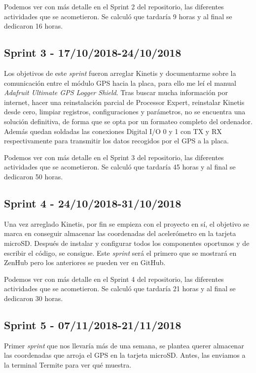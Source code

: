 Podemos ver con más detalle en el Sprint 2 del repositorio, las diferentes actividades que se acometieron. 
Se calculó que tardaría 9 horas y al final se dedicaron 16 horas.

\subsection{Sprint 3 - 17/10/2018-24/10/2018}
Los objetivos de este \textit{sprint} fueron arreglar Kinetis y documentarme sobre la comunicación entre el módulo GPS hacia la placa, para ello me leí el manual \textit{Adafruit Ultimate GPS Logger Shield}. Tras buscar mucha información por internet, hacer una reinstalación parcial de Processor Expert, reinstalar Kinetis desde cero, limpiar registros, configuraciones y parámetros, no se encuentra una solución definitiva, de forma que se opta por un formateo completo del ordenador. Además quedan soldadas las conexiones Digital I/O 0 y 1 con TX y RX respectivamente para transmitir los datos recogidos por el GPS a la placa.

Podemos ver con más detalle en el Sprint 3 del repositorio, las diferentes actividades que se acometieron. 
Se calculó que tardaría 45 horas y al final se dedicaron 50 horas.

\subsection{Sprint 4 - 24/10/2018-31/10/2018}
Una vez arreglado Kinetis, por fin se empieza con el proyecto en sí, el objetivo se marca en conseguir almacenar las coordenadas del acelerómetro en la tarjeta microSD. Después de instalar y configurar todos los componentes oportunos y de escribir el código, se consigue. Este \textit{sprint} será el primero que se mostrará en ZenHub pero los anteriores se pueden ver en GitHub.

Podemos ver con más detalle en el Sprint 4 del repositorio, las diferentes actividades que se acometieron. 
Se calculó que tardaría 21 horas y al final se dedicaron 30 horas.

\subsection{Sprint 5 - 07/11/2018-21/11/2018}
Primer \textit{sprint} que nos llevaría más de una semana, se plantea querer almacenar las coordenadas que arroja el GPS en la tarjeta microSD. Antes, las enviamos a la terminal Termite para ver qué muestra. 

